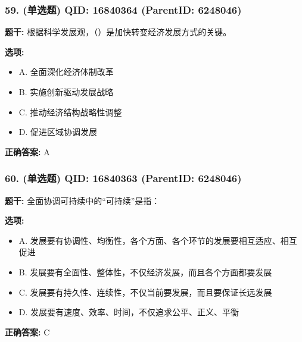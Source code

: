 \documentclass[12pt,UTF8]{ctexart}
\begin{document}
\subsubsection*{59. (单选题) \small QID: 16840364 (ParentID: 6248046)}

\textbf{题干:}
根据科学发展观，（）是加快转变经济发展方式的关键。



\textbf{选项:}
\begin{itemize}[leftmargin=*]

  \item A. 全面深化经济体制改革

  \item B. 实施创新驱动发展战略

  \item C. 推动经济结构战略性调整

  \item D. 促进区域协调发展

\end{itemize}

\textbf{正确答案:}
A

\vspace{0.3em}\hrulefill\vspace{0.7em}

\subsubsection*{60. (单选题) \small QID: 16840363 (ParentID: 6248046)}

\textbf{题干:}
全面协调可持续中的“可持续”是指：



\textbf{选项:}
\begin{itemize}[leftmargin=*]

  \item A. 发展要有协调性、均衡性，各个方面、各个环节的发展要相互适应、相互促进

  \item B. 发展要有全面性、整体性，不仅经济发展，而且各个方面都要发展

  \item C. 发展要有持久性、连续性，不仅当前要发展，而且要保证长远发展

  \item D. 发展要有速度、效率、时间，不仅追求公平、正义、平衡

\end{itemize}

\textbf{正确答案:}
C
\end{document}
